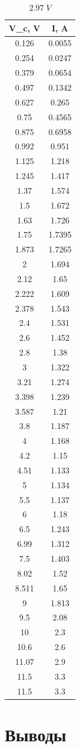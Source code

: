 \documentclass{article}
\begin{document}
\begin{table}[H]
\centering
\begin{tabular}{|c|c|}
\hline
V\_c, V & I, A   \\\hline
0.126   & 0.0055 \\\hline
0.254   & 0.0247 \\\hline
0.379   & 0.0654 \\\hline
0.497   & 0.1342 \\\hline
0.627   & 0.265  \\\hline
0.75    & 0.4565 \\\hline
0.875   & 0.6958 \\\hline
0.992   & 0.951  \\\hline
1.125   & 1.218  \\\hline
1.245   & 1.417  \\\hline
1.37    & 1.574  \\\hline
1.5     & 1.672  \\\hline
1.63    & 1.726  \\\hline
1.75    & 1.7395 \\\hline
1.873   & 1.7265 \\\hline
2       & 1.694  \\\hline
2.12    & 1.65   \\\hline
2.222   & 1.609  \\\hline
2.378   & 1.543  \\\hline
2.4     & 1.531  \\\hline
2.6     & 1.452  \\\hline
2.8     & 1.38   \\\hline
3       & 1.322  \\\hline
3.21    & 1.274  \\\hline
3.398   & 1.239  \\\hline
3.587   & 1.21   \\\hline
3.8     & 1.187  \\\hline
4       & 1.168  \\\hline
4.2     & 1.15   \\\hline
4.51    & 1.133  \\\hline
5       & 1.134  \\\hline
5.5     & 1.137  \\\hline
6       & 1.18   \\\hline
6.5     & 1.243  \\\hline
6.99    & 1.312  \\\hline
7.5     & 1.403  \\\hline
8.02    & 1.52   \\\hline
8.511   & 1.65   \\\hline
9       & 1.813  \\\hline
9.5     & 2.08   \\\hline
10      & 2.3    \\\hline
10.6    & 2.6    \\\hline
11.07   & 2.9    \\\hline
11.5    & 3.3    \\\hline
11.5    & 3.3    \\\hline
\end{tabular}
\caption{\(2.97\;V\)}
\end{table}

\section{Выводы}
\end{document}
